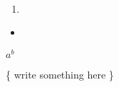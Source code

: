 
\\

\begin{enumerate}
    \item{}
\end{enumerate}

\item[5.]

\begin{itemize}
    \item{}
\end{itemize}

\( a^b \)

\{ write something here \}